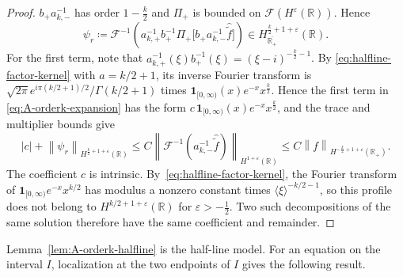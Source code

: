 \documentclass[11pt,reqno]{amsart}
\theoremstyle{plain}
\theoremstyle{definition}
\numberwithin{equation}{section}
\newcommand{\wh}[1]{\widehat{#1}}
\newcommand{\wt}[1]{\widetilde{#1}}
\newcommand{\norm}[1]{\left\lVert #1 \right\rVert}
\newcommand{\R}{\mathbb{R}}
\begin{document}
\begin{proof}
$b_+a_{k,-}^{-1}$ has order $1-\frac{k}{2}$ and
$\Pi_+$ is bounded on $\mathcal F(H^\varepsilon(\R))$. Hence
\begin{equation}
    \psi_r
    \coloneqq \mathcal{F}^{-1}\!\left(
    a_{k,+}^{-1}b_+^{-1}
    \Pi_+\!\bigl[b_+a_{k,-}^{-1}\wh{\wt f}\bigr]\right)
    \in H^{\frac{k}{2}+1+\varepsilon}_{\overline{\R_+}}(\R).
\end{equation}
For the first term, note that
$a_{k,+}^{-1}(\xi)b_+^{-1}(\xi)
=(\xi-i)^{-\frac{k}{2}-1}$.
By \eqref{eq:halfline-factor-kernel} with $a=k/2+1$, its inverse
Fourier transform is
$\sqrt{2\pi}e^{i\pi(k/2+1)/2}/\Gamma(k/2+1)$ times
$\mathbf1_{[0,\infty)}(x)e^{-x}x^{\frac{k}{2}}$.
Hence the first term in
\eqref{eq:A-orderk-expansion} has the form
$c\,\mathbf1_{[0,\infty)}(x)e^{-x}x^{\frac{k}{2}}$,
and the trace and multiplier bounds give
\begin{equation}
    |c|
    +\norm{\psi_r}_{H^{\frac{k}{2}+1+\varepsilon}(\R)}
    \le C\norm{\mathcal F^{-1}\!\left(
    a_{k,-}^{-1}\wh{\wt f}\right)}_{H^{1+\varepsilon}(\R)}
    \le C \norm{f}_{H^{-\frac{k}{2}+1+\varepsilon}(\R_+)}.
\end{equation}
The coefficient $c$ is intrinsic. By~\eqref{eq:halfline-factor-kernel},
the Fourier transform of $\mathbf1_{[0,\infty)}e^{-x}x^{k/2}$ has modulus
a nonzero constant times $\langle\xi\rangle^{-k/2-1}$, so this profile
does not belong to $H^{k/2+1+\varepsilon}(\R)$ for
$\varepsilon>-\frac12$. Two such decompositions of the same solution
therefore have the same coefficient and remainder.
\end{proof}

Lemma~\ref{lem:A-orderk-halfline} is the half-line model. For an equation on the interval $I$, localization at the two endpoints of $I$ gives the following result.
\end{document}
